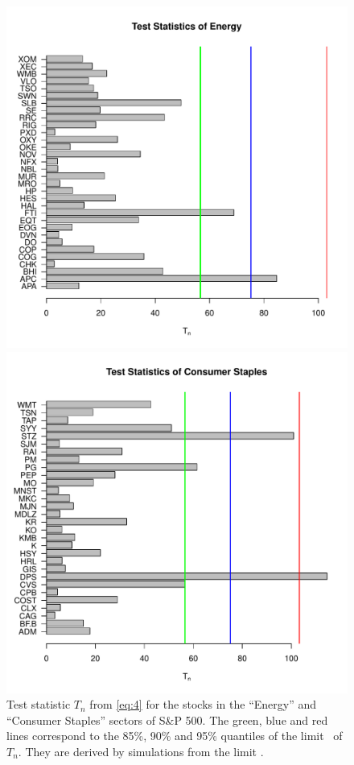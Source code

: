 \begin{figure}[htb!]
  \begin{minipage}{0.5\linewidth}
    \includegraphics[width=\textwidth]
    {Hoga_Energy_Single.pdf}
  \end{minipage}\hfill
  \begin{minipage}{0.5\linewidth}
    \includegraphics[width=\textwidth]
    {Hoga_CS_Single.pdf}
  \end{minipage}
  \caption{Test statistic $T_n$ from \eqref{eq:4} for the  stocks in the ``Energy'' and
    ``Consumer Staples'' sectors of S\&P 500. The green, blue and red
    lines correspond to the 85\%, 90\% and 95\% quantiles of the limit \ds\ of $T_n$.  They are derived
by simulations from the limit \ds .}
  \label{fig:Hoga_Single}
\end{figure}

